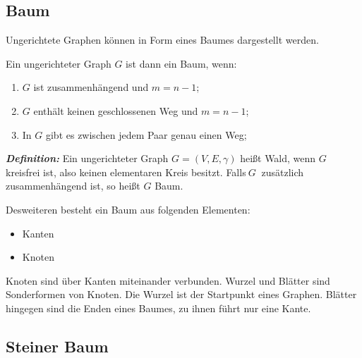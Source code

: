 \subsection{Baum}
\label{sec:2methoden}

\vspace{0.5cm}

Ungerichtete Graphen können in Form eines Baumes dargestellt werden.
\vspace{0.3cm}

Ein ungerichteter Graph $G$ ist dann ein Baum, wenn:

\begin{enumerate}
\item $G$ ist zusammenhängend und $m=n-1$;
\item$G$ enthält keinen geschlossenen Weg und $m=n-1$;
\item In $G$ gibt es zwischen jedem Paar genau einen Weg;
\end{enumerate}

\vspace{0.3cm}

\begin{graybox}
\textbf{\textit{Definition:}} Ein ungerichteter Graph $G=(V, E, \gamma)$ heißt Wald, wenn $G$ kreisfrei ist, also keinen elementaren Kreis besitzt. Falls$~G~$ zusätzlich zusammenhängend ist, so heißt $G$ Baum\cite{krumke1}.
\end{graybox}

\vspace{1cm}

\begin{flushleft}
Desweiteren besteht ein Baum aus folgenden Elementen:
\end{flushleft}


\begin{itemize}
\item Kanten
\item Knoten
\end{itemize}

Knoten sind über Kanten miteinander verbunden. Wurzel und Blätter sind Sonderformen von Knoten. Die Wurzel ist der Startpunkt eines Graphen. 
Blätter hingegen sind die Enden eines Baumes, zu ihnen führt nur eine Kante. 

\vspace{1cm}
\subsection{Steiner Baum}
\label{sec:2methoden}


